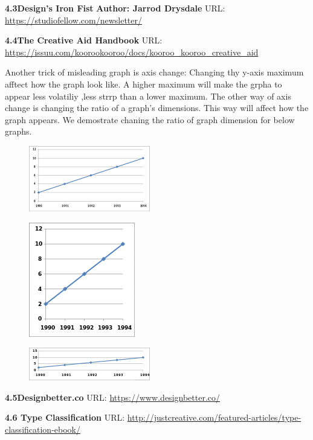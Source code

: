 \documentclass[]{book}
\theoremstyle{definition}
\theoremstyle{definition}
\theoremstyle{definition}
\theoremstyle{remark}
\begin{document}
\textbf{4.3Design's Iron Fist} \textbf{Author: Jarrod Drysdale} URL:
\url{https://studiofellow.com/newsletter/}

\textbf{4.4The Creative Aid Handbook} URL:
\url{https://issuu.com/koorookooroo/docs/kooroo_kooroo_creative_aid}

Another trick of misleading graph is axis change: Changing thy y-axis
maximum afftect how the graph look like. A higher maximum will make the
grpha to appear less volatiliy ,less strrp than a lower maximum. The
other way of axis change is changing the ratio of a graph's dimensions.
This way will affect how the graph appears. We demostrate chaning the
ratio of graph dimension for below graphs.

\begin{figure}
\centering
\includegraphics{images/Line_graph1.svg.png}
\caption{}
\end{figure}

\begin{figure}
\centering
\includegraphics{images/175px-Line_graph1-3.svg.png}
\caption{}
\end{figure}

\begin{figure}
\centering
\includegraphics{images/200px-Line_graph1-4.svg.png}
\caption{}
\end{figure}

\textbf{4.5Designbetter.co} URL: \url{https://www.designbetter.co/}

\textbf{4.6 Type Classification} URL:
\url{http://justcreative.com/featured-articles/type-classification-ebook/}
\end{document}
